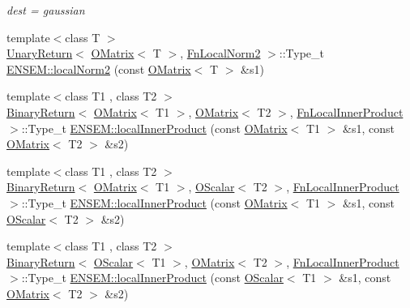 \begin{DoxyCompactItemize}
\begin{DoxyCompactList}\small\item\em dest = gaussian \end{DoxyCompactList}\item 
{\footnotesize template$<$class T $>$ }\\\mbox{\hyperlink{structENSEM_1_1UnaryReturn}{Unary\+Return}}$<$ \mbox{\hyperlink{classENSEM_1_1OMatrix}{O\+Matrix}}$<$ T $>$, \mbox{\hyperlink{structENSEM_1_1FnLocalNorm2}{Fn\+Local\+Norm2}} $>$\+::Type\+\_\+t \mbox{\hyperlink{group__obsmatrix_ga13d075f8a50ffa95c7a8a7fa61fe8028}{E\+N\+S\+E\+M\+::local\+Norm2}} (const \mbox{\hyperlink{classENSEM_1_1OMatrix}{O\+Matrix}}$<$ T $>$ \&s1)
\item 
{\footnotesize template$<$class T1 , class T2 $>$ }\\\mbox{\hyperlink{structENSEM_1_1BinaryReturn}{Binary\+Return}}$<$ \mbox{\hyperlink{classENSEM_1_1OMatrix}{O\+Matrix}}$<$ T1 $>$, \mbox{\hyperlink{classENSEM_1_1OMatrix}{O\+Matrix}}$<$ T2 $>$, \mbox{\hyperlink{structENSEM_1_1FnLocalInnerProduct}{Fn\+Local\+Inner\+Product}} $>$\+::Type\+\_\+t \mbox{\hyperlink{group__obsmatrix_ga53af10b5c51df2876f7569d4691cbd0d}{E\+N\+S\+E\+M\+::local\+Inner\+Product}} (const \mbox{\hyperlink{classENSEM_1_1OMatrix}{O\+Matrix}}$<$ T1 $>$ \&s1, const \mbox{\hyperlink{classENSEM_1_1OMatrix}{O\+Matrix}}$<$ T2 $>$ \&s2)
\item 
{\footnotesize template$<$class T1 , class T2 $>$ }\\\mbox{\hyperlink{structENSEM_1_1BinaryReturn}{Binary\+Return}}$<$ \mbox{\hyperlink{classENSEM_1_1OMatrix}{O\+Matrix}}$<$ T1 $>$, \mbox{\hyperlink{classENSEM_1_1OScalar}{O\+Scalar}}$<$ T2 $>$, \mbox{\hyperlink{structENSEM_1_1FnLocalInnerProduct}{Fn\+Local\+Inner\+Product}} $>$\+::Type\+\_\+t \mbox{\hyperlink{group__obsmatrix_ga23c94fe0afdadaedf50d233d675f0009}{E\+N\+S\+E\+M\+::local\+Inner\+Product}} (const \mbox{\hyperlink{classENSEM_1_1OMatrix}{O\+Matrix}}$<$ T1 $>$ \&s1, const \mbox{\hyperlink{classENSEM_1_1OScalar}{O\+Scalar}}$<$ T2 $>$ \&s2)
\item 
{\footnotesize template$<$class T1 , class T2 $>$ }\\\mbox{\hyperlink{structENSEM_1_1BinaryReturn}{Binary\+Return}}$<$ \mbox{\hyperlink{classENSEM_1_1OScalar}{O\+Scalar}}$<$ T1 $>$, \mbox{\hyperlink{classENSEM_1_1OMatrix}{O\+Matrix}}$<$ T2 $>$, \mbox{\hyperlink{structENSEM_1_1FnLocalInnerProduct}{Fn\+Local\+Inner\+Product}} $>$\+::Type\+\_\+t \mbox{\hyperlink{group__obsmatrix_gac43a43c02ea508251047ef46cbc6924c}{E\+N\+S\+E\+M\+::local\+Inner\+Product}} (const \mbox{\hyperlink{classENSEM_1_1OScalar}{O\+Scalar}}$<$ T1 $>$ \&s1, const \mbox{\hyperlink{classENSEM_1_1OMatrix}{O\+Matrix}}$<$ T2 $>$ \&s2)

\end{DoxyCompactItemize}
